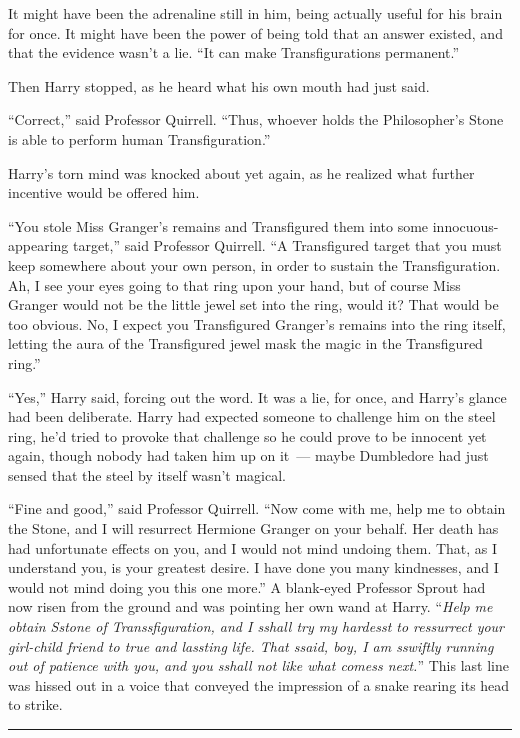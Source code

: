 It might have been the adrenaline still in him, being actually useful for his brain for once. It might have been the power of being told that an answer existed, and that the evidence wasn't a lie. ``It can make Transfigurations permanent.''

Then Harry stopped, as he heard what his own mouth had just said.

``Correct,'' said Professor Quirrell. ``Thus, whoever holds the Philosopher's Stone is able to perform human Transfiguration.''

Harry's torn mind was knocked about yet again, as he realized what further incentive would be offered him.

``You stole Miss Granger's remains and Transfigured them into some innocuous-appearing target,'' said Professor Quirrell. ``A Transfigured target that you must keep somewhere about your own person, in order to sustain the Transfiguration. Ah, I see your eyes going to that ring upon your hand, but of course Miss Granger would not be the little jewel set into the ring, would it? That would be too obvious. No, I expect you Transfigured Granger's remains into the ring itself, letting the aura of the Transfigured jewel mask the magic in the Transfigured ring.''

``Yes,'' Harry said, forcing out the word. It was a lie, for once, and Harry's glance had been deliberate. Harry had expected someone to challenge him on the steel ring, he'd tried to provoke that challenge so he could prove to be innocent yet again, though nobody had taken him up on it~--- maybe Dumbledore had just sensed that the steel by itself wasn't magical.

``Fine and good,'' said Professor Quirrell. ``Now come with me, help me to obtain the Stone, and I will resurrect Hermione Granger on your behalf. Her death has had unfortunate effects on you, and I would not mind undoing them. That, as I understand you, is your greatest desire. I have done you many kindnesses, and I would not mind doing you this one more.'' A blank-eyed Professor Sprout had now risen from the ground and was pointing her own wand at Harry. ``\emph{Help me obtain Sstone of Transsfiguration, and I sshall try my hardesst to ressurrect your girl-child friend to true and lassting life. That ssaid, boy, I am sswiftly running out of patience with you, and you sshall not like what comess next.}'' This last line was hissed out in a voice that conveyed the impression of a snake rearing its head to strike.

\begin{center}\rule{3in}{0.4pt}\end{center}

